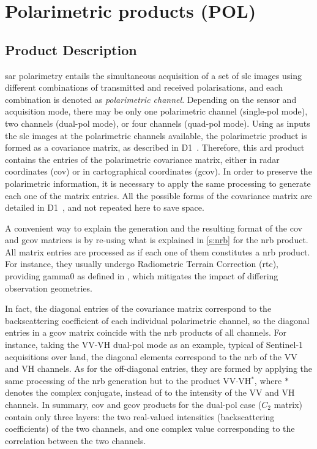 \section{Polarimetric products (POL)}
\label{sec:pol_products}

\subsection{Product Description}
\label{sec:description_pol}

\acs{sar} polarimetry entails the simultaneous acquisition of a set of \acs{slc} images using different combinations of transmitted and received polarisations, and each combination is denoted as \textit{polarimetric channel}. Depending on the sensor and acquisition mode, there may be only one polarimetric channel (single-pol mode), two channels (dual-pol mode), or four channels (quad-pol mode). Using as inputs the \acs{slc} images at the polarimetric channels available, the polarimetric product is formed as a covariance matrix, as described in D1~\cite{D1}. Therefore, this \acs{ard} product contains the entries of the polarimetric covariance matrix, either in radar coordinates (\acs{cov}) or in cartographical coordinates (\acs{gcov}). In order to preserve the polarimetric information, it is necessary to apply the same processing to generate each one of the matrix entries. All the possible forms of the covariance matrix are detailed in D1~\cite{D1}, and not repeated here to save space.

A convenient way to explain the generation and the resulting format of the \acs{cov} and \acs{gcov} matrices is by re-using what is explained in \autoref{s:nrb} for the \acs{nrb} product. All matrix entries are processed as if each one of them constitutes a \acs{nrb} product. For instance, they
usually undergo Radiometric Terrain Correction (\acs{rtc}), providing \gls{gamma0} as defined in \cite{Small2011}, which mitigates the impact of differing observation geometries. 

In fact, the diagonal entries of the covariance matrix correspond to the backscattering coefficient of each individual polarimetric channel, so the diagonal entries in a \acs{gcov} matrix coincide with the \acs{nrb} products of all channels. For instance, taking the VV-VH dual-pol mode as an example, typical of Sentinel-1 acquisitions over land, the diagonal elements  correspond to the \acs{nrb} of the VV and VH channels. As for the off-diagonal entries, they are formed by applying the same processing of the \acs{nrb} generation but to the product VV$\cdot$VH$^*$, where $*$ denotes the complex conjugate, instead of to the intensity of the VV and VH channels. In summary, \acs{cov} and \acs{gcov} products for the dual-pol case ($C_2$ matrix) contain only three layers: the two real-valued intensities (backscattering coefficients) of the two channels, and one complex value corresponding to the correlation between the two channels.

